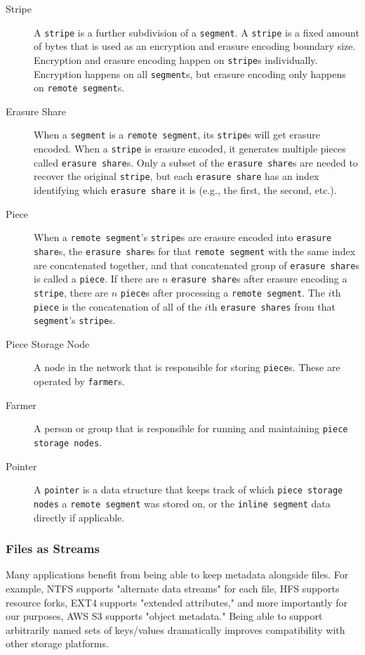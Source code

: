 \documentclass[a4paper,10pt]{article}
\newcommand{\x}[1]{{\tt #1}}
\begin{document}
\begin{description}
\item[Stripe] A \x{stripe} is a further subdivision of a \x{segment}. A \x{stripe}
is a fixed amount of bytes that is used as an encryption and erasure encoding
boundary size. Encryption and erasure encoding happen on \x{stripe}s
individually. Encryption happens on all \x{segment}s, but erasure encoding only
happens on \x{remote segment}s.

\item[Erasure Share] When a \x{segment} is a \x{remote segment}, its \x{stripe}s
will get erasure encoded. When a \x{stripe} is erasure encoded, it generates
multiple pieces called \x{erasure share}s. Only a subset of the
\x{erasure share}s are needed to recover the original \x{stripe}, but each
\x{erasure share} has an index identifying which \x{erasure share} it is (e.g.,
the first, the second, etc.).

\item[Piece] When a \x{remote segment}'s \x{stripe}s are erasure encoded into
\x{erasure share}s, the \x{erasure share}s for that \x{remote segment} with the
same index are concatenated together, and that concatenated group of
\x{erasure share}s is called a \x{piece}. If there are $n$ \x{erasure share}s
after erasure encoding a \x{stripe}, there are $n$ \x{piece}s after processing
a \x{remote segment}. The $i$th \x{piece} is the concatenation of all of the
$i$th \x{erasure shares} from that \x{segment}'s \x{stripe}s.

\item[Piece Storage Node] A node in the network that is responsible for storing
\x{piece}s. These are operated by \x{farmer}s.

\item[Farmer] A person or group that is responsible for running and maintaining
\x{piece storage nodes}.

\item[Pointer] A \x{pointer} is a data structure that keeps track of which
\x{piece storage nodes} a \x{remote segment} was stored on, or the
\x{inline segment} data directly if applicable.

\end{description}

\subsubsection{Files as Streams}

Many applications benefit from being able to keep metadata alongside files.
For example, NTFS supports "alternate data streams" for each file, HFS supports
resource forks, EXT4 supports "extended attributes," and more importantly for
our purposes, AWS S3 supports "object metadata."\cite{s3-object-meta} Being
able to support arbitrarily named sets of keys/values dramatically improves
compatibility with other storage platforms.
\end{document}
